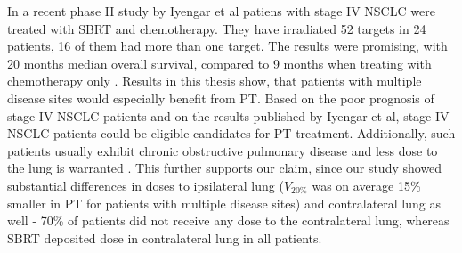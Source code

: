 



In a recent phase II study by Iyengar et al \cite{Iyengar2014} patiens with stage IV NSCLC were treated with SBRT and chemotherapy. 
They have irradiated 52 targets in 24 patients, 16 of them had more than one target. The results were promising, with 20 months median overall survival, 
compared to 9 months when treating with chemotherapy only \cite{Tsao2008}. Results in this thesis show, that patients with multiple disease sites 
would especially benefit from PT. Based on the poor prognosis of stage IV NSCLC patients and on the results published by Iyengar et al,
stage IV NSCLC patients could be eligible candidates for PT treatment. Additionally, such patients usually exhibit chronic obstructive pulmonary disease and 
less dose to the lung is warranted \cite{Westover2012}. This further supports our claim, since our study showed substantial differences in 
doses to ipsilateral lung ($V_{20\%}$ was on average 15\% smaller in PT for patients with multiple disease sites) and 
contralateral lung as well - 70\% of patients did not receive any dose to the contralateral lung, whereas SBRT deposited dose in contralateral lung in all patients.

